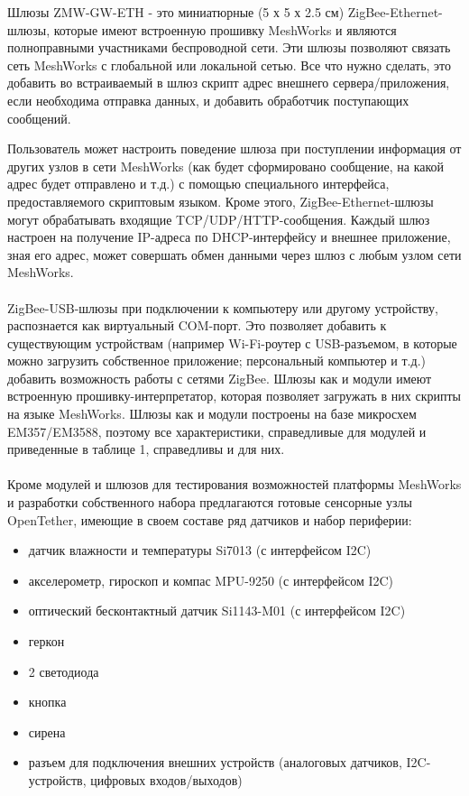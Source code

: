 \documentclass[12pt]{article}
\begin{document}
Шлюзы ZMW-GW-ETH - это миниатюрные (5 х 5 х 2.5 см) ZigBee-Ethernet-шлюзы, которые 
имеют встроенную прошивку MeshWorks и являются полноправными участниками
беспроводной сети. Эти шлюзы позволяют связать сеть MeshWorks с глобальной или 
локальной сетью. Все что нужно сделать, это добавить во встраиваемый в шлюз скрипт 
адрес внешнего сервера/приложения, если необходима отправка данных, и добавить
обработчик поступающих сообщений.

Пользователь может настроить поведение шлюза при поступлении информация от других 
узлов в сети MeshWorks (как будет сформировано сообщение, на какой адрес будет отправлено
и т.д.) с помощью специального интерфейса, предоставляемого скриптовым языком. 
Кроме этого, ZigBee-Ethernet-шлюзы могут обрабатывать входящие TCP/UDP/HTTP-сообщения.
Каждый шлюз настроен на получение IP-адреса по DHCP-интерфейсу и
внешнее приложение, зная его адрес, может совершать обмен данными через шлюз с любым
узлом сети MeshWorks.
\\\\
ZigBee-USB-шлюзы при подключении к компьютеру или другому устройству, распознается
как виртуальный COM-порт. Это позволяет добавить к существующим устройствам 
(например Wi-Fi-роутер с USB-разъемом, в которые можно загрузить собственное приложение;
персональный компьютер и т.д.) добавить возможность работы с сетями ZigBee. Шлюзы
как и модули имеют встроенную прошивку-интерпретатор, которая позволяет загружать
в них скрипты на языке MeshWorks. Шлюзы как и модули построены на базе микросхем
EM357/EM3588, поэтому все характеристики, справедливые для модулей и приведенные
в таблице 1, справедливы и для них.
\\\\
Кроме модулей и шлюзов для тестирования возможностей платформы MeshWorks и разработки
собственного набора предлагаются готовые сенсорные узлы OpenTether, имеющие в своем 
составе ряд датчиков и набор периферии:
\begin{itemize}
    \item датчик влажности и температуры Si7013 (с интерфейсом I2C)
    \item акселерометр, гироскоп и компас MPU-9250 (с интерфейсом I2C)
    \item оптический бесконтактный датчик Si1143-M01 (с интерфейсом I2C)
    \item геркон
    \item 2 светодиода
    \item кнопка
    \item сирена
    \item разъем для подключения внешних устройств (аналоговых датчиков, I2C-устройств,
    цифровых входов/выходов)
\end{itemize}
\end{document}
